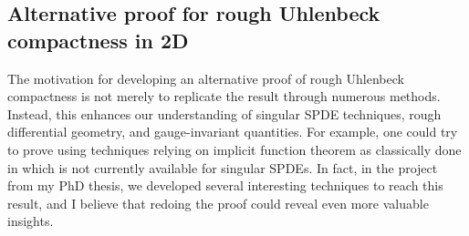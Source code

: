 \documentclass[12pt]{article}
\numberwithin{equation}{section}
\theoremstyle{definition}
\theoremstyle{remark}
\newcommand{\diff}{\mathrm{d}}
\newcommand{\1}{\mathbf 1}
\newcommand{\<}{\langle}
\renewcommand{\>}{\rangle}
\newcommand{\orange}[1]{\textcolor{orange}{#1}}
\begin{document}




\subsection{Alternative proof for rough Uhlenbeck compactness in 2D}




The motivation for developing an alternative proof of rough Uhlenbeck compactness is not merely to replicate the result through numerous methods. Instead, this enhances our understanding of singular SPDE techniques, rough differential geometry, and gauge-invariant quantities. For example, one could try to prove using techniques relying on implicit function theorem as classically done in \cite{Uhlenbeck82} which is not currently available for singular SPDEs.
%
%
In fact, in the project  from my PhD thesis, we developed several interesting techniques to reach this result, and I believe that redoing the proof could reveal even more valuable insights.
\end{document}
